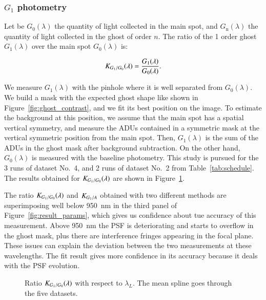 \subsubsection{$G_1$ photometry}
\label{sec:ghost}

Let be $G_0(\lambda)$ the quantity of light collected in the main spot, and $G_\mathrm{n}(\lambda)$ the quantity of light collected in the ghost of order $n$. The ratio of the 1 order ghost $G_1(\lambda)$ over the main spot $G_0(\lambda)$ is:

\begin{equation}
    K_{G_1/G_0}(\lambda) = \frac{G_1(\lambda)}{G_0(\lambda)}.
    \label{eq:ratio_ghost}
\end{equation}

We measure $G_1(\lambda)$ with the \spinhole pinhole where it is well separated from $G_0(\lambda)$. We build a mask with the expected ghost shape like shown in Figure~\ref{fig:ghost_contrast}, and we fit its best position on the image. To estimate the background at this position, we assume that the main spot has a spatial vertical symmetry, and measure the ADUs contained in a symmetric mask at the vertical symmetric position from the main spot. Then, $G_1(\lambda)$ is the sum of the ADUs in the ghost mask after background subtraction. On the other hand, $G_0(\lambda)$ is measured with the baseline photometry. This study is pursued for the 3 runs of dataset No.~4, and 2 runs of dataset No.~2 from Table~\ref{tab:schedule}. The results obtained for $K_{G_1/G_0}(\lambda)$ are shown in Figure~\ref{fig:ghost_ratio}. 

The ratio $K_{G_1/G_0}(\lambda)$ and $K_{G_1/A}$ obtained with two different methods are superimposing well below \SI{950}{\nano\meter} in the third panel of Figure~\ref{fig:result_params}, which gives us confidence about tue accuracy of this measurement. Above \SI{950}{\nano\meter} the PSF is deteriorating and starts to overflow in the ghost mask, plus there are interference fringes appearing in the focal plane. These issues can explain the deviation between the two measurements at these wavelengths. The fit result gives more confidence in its accuracy because it deals with the PSF evolution.

\begin{figure}[h]
     \centering
     \caption{Ratio $K_{G_1/G_0}(\lambda)$ with respect to $\lambda_L$. The mean spline goes through the five datasets.}
     \label{fig:ghost_ratio}
\end{figure}

